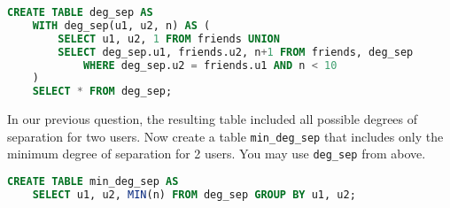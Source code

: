 \begin{questions}
\begin{solution}[2in]
\begin{lstlisting}[language=SQL]
CREATE TABLE deg_sep AS
    WITH deg_sep(u1, u2, n) AS (
        SELECT u1, u2, 1 FROM friends UNION
        SELECT deg_sep.u1, friends.u2, n+1 FROM friends, deg_sep
            WHERE deg_sep.u2 = friends.u1 AND n < 10
    )
    SELECT * FROM deg_sep;
\end{lstlisting}
\end{solution}

\question
In our previous question, the resulting table included all possible degrees of separation for two users. Now create a table \texttt{min\_deg\_sep} that includes only the minimum degree of separation for 2 users. You may use \texttt{deg\_sep} from above.

\begin{solution}[0.5in]
\begin{lstlisting}[language=SQL]
CREATE TABLE min_deg_sep AS
    SELECT u1, u2, MIN(n) FROM deg_sep GROUP BY u1, u2;
\end{lstlisting}
\end{solution}
\end{questions}
